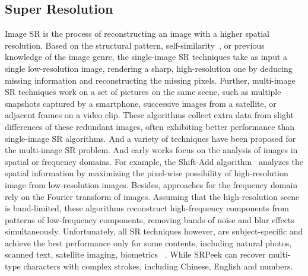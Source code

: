 \subsection{Super Resolution}
Image SR is the process of reconstructing an image with a higher spatial resolution. Based on the structural pattern, self-similarity~\cite{suetake2008image}, or previous knowledge of the image genre, the single-image SR techniques take as input a single low-resolution image, rendering a sharp, high-resolution one by deducing missing information and reconstructing the missing pixels. Further, multi-image SR techniques work on a set of pictures on the same scene, such as multiple snapshots captured by a smartphone, successive images from a satellite, or adjacent frames on a video clip. These algorithms collect extra data from slight differences of these redundant images, often exhibiting better performance than single-image SR algorithms. And a variety of techniques have been proposed for the multi-image SR problem. And early works focus on the analysis of images in spatial or frequency domains. For example, the Shift-Add algorithm~\cite{farsiu2003robust} analyzes the spatial information by maximizing the pixel-wise possibility of high-resolution image from low-resolution images. Besides, approaches for the frequency domain rely on the Fourier transform of images. Assuming that the high-resolution scene is band-limited, these algorithms reconstruct high-frequency components from patterns of low-frequency components, removing bands of noise and blur effects simultaneously. Unfortunately, all SR techniques however, are subject-specific and achieve the best performance only for some contents, including natural photos, scanned text, satellite imaging, biometrics~\cite{Youm2016Image}
. While \textsf{SRPeek} can recover multi-type characters with complex strokes, including Chinese, English and numbers.


